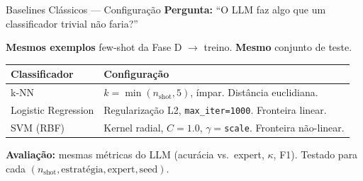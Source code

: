\documentclass[aspectratio=169,12pt]{beamer}
\begin{document}
\begin{frame}{Baselines Clássicos --- Configuração}
\small
\textbf{Pergunta:} ``O LLM faz algo que um classificador trivial não faria?''

\vspace{0.2cm}
\textbf{Mesmos exemplos} few-shot da Fase D $\rightarrow$ treino. \textbf{Mesmo} conjunto de teste.

\begin{center}
\begin{tabular}{lp{7cm}}
\toprule
\textbf{Classificador} & \textbf{Configuração} \\
\midrule
k-NN & $k = \min(n_{\text{shot}}, 5)$, ímpar. Distância euclidiana. \\
Logistic Regression & Regularização L2, \texttt{max\_iter=1000}. Fronteira linear. \\
SVM (RBF) & Kernel radial, $C=1.0$, $\gamma=$\texttt{scale}. Fronteira não-linear. \\
\bottomrule
\end{tabular}
\end{center}

\vspace{0.2cm}
\textbf{Avaliação:} mesmas métricas do LLM (acurácia vs.\ expert, $\kappa$, F1).
Testado para cada $(n_{\text{shot}}, \text{estratégia}, \text{expert}, \text{seed})$.
\end{frame}
\end{document}
